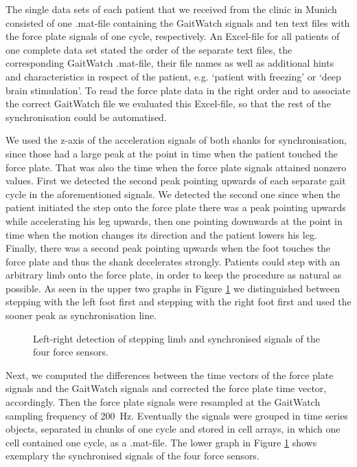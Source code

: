 The single data sets of each patient that we received from the clinic in Munich consisted of one .mat-file containing the GaitWatch signals and ten text files with the force plate signals of one cycle, respectively. An Excel-file for all patients of one complete data set stated the order of the separate text files, the corresponding GaitWatch .mat-file, their file names as well as additional hints and characteristics in respect of the patient, e.g. `patient with freezing' or `deep brain stimulation'. To read the force plate data in the right order and to associate the correct GaitWatch file we evaluated this Excel-file, so that the rest of the synchronisation could be automatised.

We used the z-axis of the acceleration signals of both shanks for synchronisation, since those had a large peak at the point in time when the patient touched the force plate. That was also the time when the force plate signals attained nonzero values.  First we detected the second peak pointing upwards of each separate gait cycle in the aforementioned signals. We detected the second one since when the patient initiated the step onto the force plate there was a peak pointing upwards while accelerating his leg upwards, then one pointing downwards at the point in time when the motion changes its direction and the patient lowers his leg. Finally, there was a second peak pointing upwards when the foot touches the force plate and thus the shank decelerates strongly. Patients could step with an arbitrary limb onto the force plate, in order to keep the procedure as natural as possible. As seen in the upper two graphs in Figure \ref{fig:left_right_detect} we distinguished between stepping with the left foot first and stepping with the right foot first and used the sooner peak as synchronisation line. 

\begin{figure}
	\centering
	\caption{Left-right detection of stepping limb and synchronised signals of the four force sensors.}
	\label{fig:left_right_detect}
\end{figure}

  Next, we computed the differences between the time vectors of the force plate signals and the GaitWatch signals and corrected the force plate time vector, accordingly. Then the force plate signals were resampled at the GaitWatch sampling frequency of \mbox{200 Hz}. Eventually the signals were grouped in time series objects, separated in chunks of one cycle and stored in cell arrays, in which one cell contained one cycle, as a .mat-file. The lower graph in Figure \ref{fig:left_right_detect} shows exemplary the synchronised signals of the four force sensors. 

